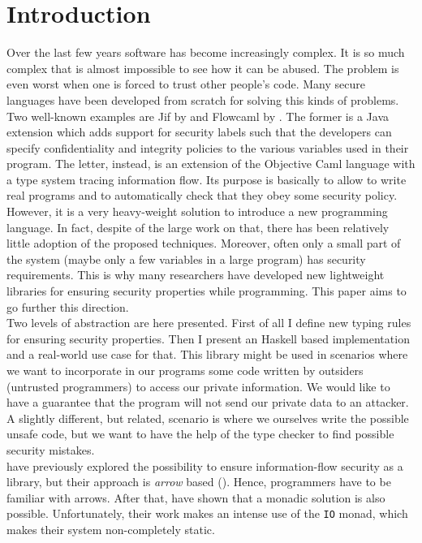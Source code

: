 \section{Introduction}
Over the last few years software has become increasingly complex. It is so much complex that is almost impossible to see how it can be abused. The problem is even worst when one is forced to trust other people's code. Many secure languages have been developed from scratch for solving this kinds of problems. Two well-known examples are Jif \cite{pullicino2014jif} by \citeauthor{pullicino2014jif} and Flowcaml \cite{simonet2003flow} by \citeauthor{simonet2003flow}. The former is a Java extension which adds support for security labels such that the developers can specify confidentiality and integrity policies to the various variables used in their program. The letter, instead, is an extension of the Objective Caml language with a type system tracing information flow. Its purpose is basically to allow to write real programs and to automatically check that they obey some security policy. \\
However, it is a very heavy-weight solution to introduce a new programming language. In fact, despite of the large work on that, there has been relatively little adoption of the proposed techniques. Moreover, often only a small part of the system (maybe only a few variables in a large program) has security requirements. This is why many researchers have developed new lightweight libraries for ensuring security properties while programming. This paper aims to go further this direction. \\
Two levels of abstraction are here presented. First of all I define new typing rules for ensuring security properties. Then I present an Haskell based implementation and a real-world use case for that. This library might be used in scenarios where we want to incorporate in our programs some code written by outsiders (untrusted programmers) to access our private information. We would like to have a guarantee that the program will not send our private data to an attacker. A slightly different, but related, scenario is where we ourselves write the possible unsafe code, but we want to have the help of the type checker to find possible security mistakes. \\
\citeauthor{li2006encoding} \cite{li2006encoding} have previously explored the possibility to ensure information-flow security as a library, but their approach is \textit{arrow} based (\cite{hughes2000generalising}). Hence, programmers have to be familiar with arrows. After that, \citeauthor{russo2008library} \cite{russo2008library} have shown that a monadic solution is also possible. Unfortunately, their work makes an intense use of the \texttt{IO} monad, which makes their system non-completely static. \\
